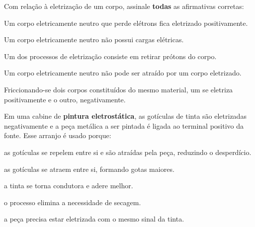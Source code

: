 \begin{questao}[1]{}
Com relação à eletrização de um corpo, assinale \textbf{todas} as afirmativas corretas:
\begin{alternativas}
\item Um corpo eletricamente neutro que perde elétrons fica eletrizado positivamente.
\item Um corpo eletricamente neutro não possui cargas elétricas.
\item Um dos processos de eletrização consiste em retirar prótons do corpo.
\item Um corpo eletricamente neutro não pode ser atraído por um corpo eletrizado.
\item Friccionando-se dois corpos constituídos do mesmo material, um se eletriza
      positivamente e o outro, negativamente.
\end{alternativas}
\end{questao}

\begin{questao}[1]{}
Em uma cabine de \textbf{pintura eletrostática}, as gotículas de tinta são
eletrizadas negativamente e a peça metálica a ser pintada é ligada ao terminal
positivo da fonte. Esse arranjo é usado porque:
\begin{alternativas}
\item as gotículas se repelem entre si e são atraídas pela peça, reduzindo o desperdício.
\item as gotículas se atraem entre si, formando gotas maiores.
\item a tinta se torna condutora e adere melhor.
\item o processo elimina a necessidade de secagem.
\item a peça precisa estar eletrizada com o mesmo sinal da tinta.
\end{alternativas}
\end{questao}

